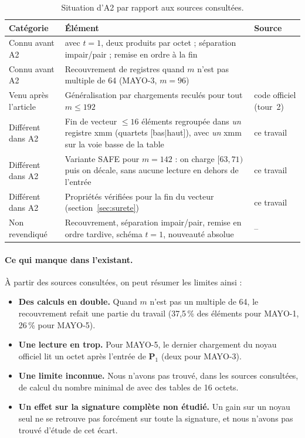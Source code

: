\begin{table}[ht]\centering\small
\caption{Situation d'A2 par rapport aux sources consultées.}\label{tab:etat}
\begin{tabularx}{\linewidth}{@{}lXX@{}}\toprule
Catégorie & Élément & Source\\\midrule
Connu avant A2 & \vpshufb{} avec $t=1$, deux produits par octet ; séparation impair/pair ; remise en ordre à la fin & \cite{nibbling}\\
Connu avant A2 & Recouvrement de registres quand $m$ n'est pas multiple de 64 (MAYO-3, $m=96$) & \cite{nibbling}\\
Venu après l'article & Généralisation par chargements reculés pour tout $m\le192$ & code officiel (tour~2)\\
Différent dans A2 & Fin de vecteur $\le16$ éléments regroupée dans \emph{un} registre xmm (quartets [bas$\mid$haut]), avec \emph{un} \vpshufb{} xmm sur la voie basse de la table & ce travail\\
Différent dans A2 & Variante SAFE pour $m=142$ : on charge $[63,71)$ puis on décale, sans aucune lecture en dehors de l'entrée & ce travail\\
Différent dans A2 & Propriétés vérifiées pour la fin du vecteur (section~\ref{sec:surete}) & ce travail\\
Non revendiqué & Recouvrement, séparation impair/pair, remise en ordre tardive, schéma $t=1$, nouveauté absolue & --\\\bottomrule
\end{tabularx}
\end{table}

\paragraph{Ce qui manque dans l'existant.} À partir des sources consultées, on peut résumer les limites ainsi :
\begin{itemize}[itemsep=1pt]
\item \textbf{Des calculs en double.} Quand $m$ n'est pas un multiple de 64, le recouvrement refait une partie du travail (37,5\,\% des éléments pour MAYO-1, 26\,\% pour MAYO-5).
\item \textbf{Une lecture en trop.} Pour MAYO-5, le dernier chargement du noyau officiel lit un octet après l'entrée de $\mathbf{P}_1$ (deux pour MAYO-3).
\item \textbf{Une limite inconnue.} Nous n'avons pas trouvé, dans les sources consultées, de calcul du nombre minimal de \vpshufb{} avec des tables de 16 octets.
\item \textbf{Un effet sur la signature complète non étudié.} Un gain sur un noyau seul ne se retrouve pas forcément sur toute la signature, et nous n'avons pas trouvé d'étude de cet écart.
\end{itemize}

